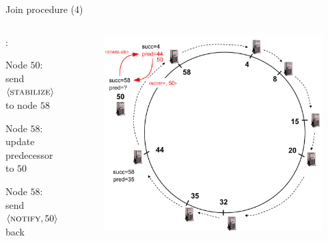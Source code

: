 \begin{frame}{Join procedure (4)}

\begin{columns}
\begin{column}{0.4\textwidth}
:
\BI
\item Node $50$: send $\langle \textsc{stabilize} \rangle$ to node $58$ 
\item Node $58$: update predecessor to $50$  
\item Node $58$: send $\langle \textsc{notify}, 50 \rangle$ back
\EI

\end{column}
\begin{column}{0.6\textwidth}
\begin{figure}
\includegraphics[width=1.0\textwidth]{figs/10/chord-example5}
\end{figure}
\end{column}
\end{columns}

\end{frame}

